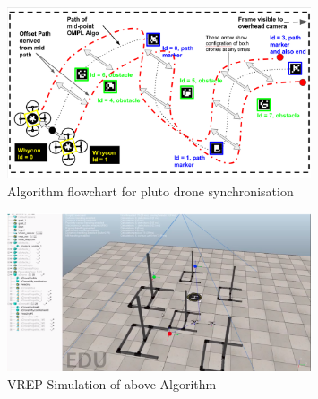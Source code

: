 \newline \begin{figure}[H]
    \centering
    \includegraphics[width=0.8\textwidth]{images/plutoswarmAlgo.png}
    \caption{Algorithm flowchart for pluto drone synchronisation}
\end{figure}
\newline \begin{figure}[H]
    \centering
    \includegraphics[width=0.8\textwidth]{images/plutoswarmVREP.png}
    \caption{VREP Simulation of above Algorithm}
\end{figure}

